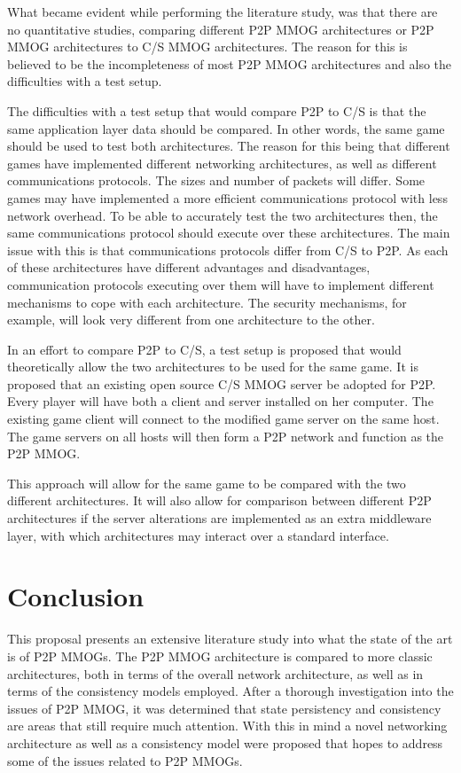 \documentclass[journal,oneside,a4paper,onecolumn]{IEEEtran}
\begin{document}
What became evident while performing the literature study, was that there are no quantitative studies, comparing different P2P MMOG architectures or P2P MMOG architectures to C/S MMOG architectures. The reason for this is believed to be the incompleteness of most P2P MMOG architectures and also the difficulties with a test setup.

The difficulties with a test setup that would compare P2P to C/S is that the same application layer data should be compared. In other words, the same game should be used to test both architectures. The reason for this being that different games have implemented different networking architectures, as well as different communications protocols. The sizes and number of packets will differ. Some games may have implemented a more efficient communications protocol with less network overhead. To be able to accurately test the two architectures then, the same communications protocol should execute over these architectures. The main issue with this is that communications protocols differ from C/S to P2P. As each of these architectures have different advantages and disadvantages, communication protocols executing over them will have to implement different mechanisms to cope with each architecture. The security mechanisms, for example, will look very different from one architecture to the other.

In an effort to compare P2P to C/S, a test setup is proposed that would theoretically allow the two architectures to be used for the same game. It is proposed that an existing open source C/S MMOG server be adopted for P2P. Every player will have both a client and server installed on her computer. The existing game client will connect to the modified game server on the same host. The game servers on all hosts will then form a P2P network and function as the P2P MMOG.

This approach will allow for the same game to be compared with the two different architectures. It will also allow for comparison between different P2P architectures if the server alterations are implemented as an extra middleware layer, with which architectures may interact over a standard interface.

\section{Conclusion}

This proposal presents an extensive literature study into what the state of the art is of P2P MMOGs. The P2P MMOG architecture is compared to more classic architectures, both in terms of the overall network architecture, as well as in terms of the consistency models employed. After a thorough investigation into the issues of P2P MMOG, it was determined that state persistency and consistency are areas that still require much attention. With this in mind a novel networking architecture as well as a consistency model were proposed that hopes to address some of the issues related to P2P MMOGs.
\end{document}
